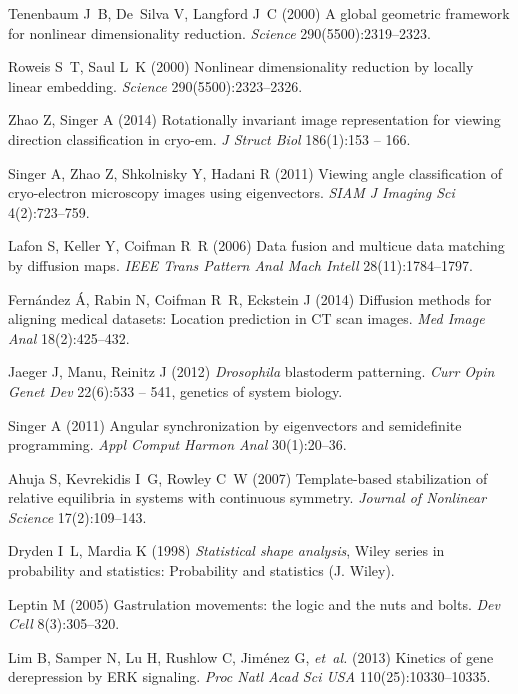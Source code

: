 \documentclass{pnastwo}
\begin{document}
\begin{article}
\begin{thebibliography}{10}
Tenenbaum J~B, De~Silva V, Langford J~C (2000) A global geometric framework for
  nonlinear dimensionality reduction. \textit{Science} 290(5500):2319--2323.

Roweis S~T, Saul L~K (2000) Nonlinear dimensionality reduction by locally
  linear embedding. \textit{Science} 290(5500):2323--2326.

Zhao Z, Singer A (2014) Rotationally invariant image representation for viewing
  direction classification in cryo-em. \textit{J Struct Biol}
  186(1):153 -- 166.

Singer A, Zhao Z, Shkolnisky Y, Hadani R (2011) Viewing angle classification of
  cryo-electron microscopy images using eigenvectors. \textit{SIAM J Imaging Sci} 4(2):723--759.

Lafon S, Keller Y, Coifman R~R (2006) Data fusion and multicue data matching by
  diffusion maps. \textit{IEEE Trans Pattern Anal Mach Intell} 28(11):1784--1797.

Fern{\'a}ndez {\'A}, Rabin N, Coifman R~R, Eckstein J (2014) Diffusion methods
  for aligning medical datasets: Location prediction in {CT} scan images.
  \textit{Med Image Anal} 18(2):425--432.

Jaeger J, Manu, Reinitz J (2012) \textit{{D}rosophila} blastoderm patterning.
  \textit{Curr Opin Genet Dev} 22(6):533 -- 541, genetics of system biology.

Singer A (2011) Angular synchronization by eigenvectors and semidefinite
  programming. \textit{Appl Comput Harmon Anal}
  30(1):20--36.

Ahuja S, Kevrekidis I~G, Rowley C~W (2007) Template-based stabilization of
  relative equilibria in systems with continuous symmetry. \textit{Journal of
  Nonlinear Science} 17(2):109--143.

Dryden I~L, Mardia K (1998) \textit{Statistical shape analysis}, Wiley series
  in probability and statistics: Probability and statistics (J. Wiley).

Leptin M (2005) Gastrulation movements: the logic and the nuts and bolts.
  \textit{Dev Cell} 8(3):305--320.

Lim B, Samper N, Lu H, Rushlow C, Jim{\'e}nez G, \textit{et~al.} (2013)
  Kinetics of gene derepression by {ERK} signaling. \textit{Proc Natl Acad Sci USA} 110(25):10330--10335.


\end{thebibliography}
\end{article}
\end{document}
